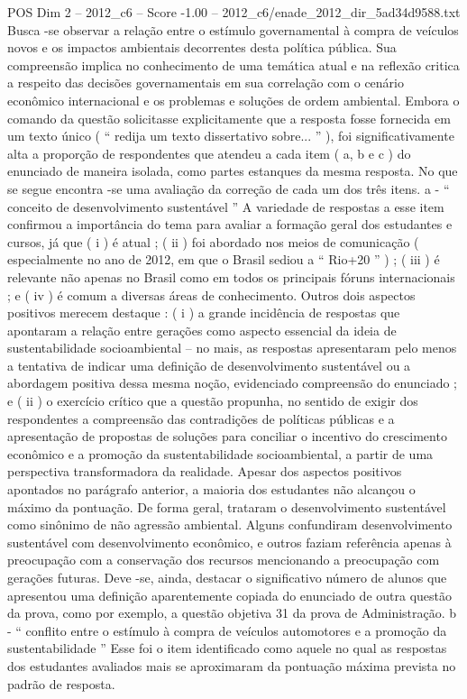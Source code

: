 \begin{textsample}{POS Dim 2 – 2012\_c6 – Score -1.00 – 2012\_c6/enade\_2012\_dir\_5ad34d9588.txt}
Busca -se observar a relação entre o estímulo governamental à compra de veículos novos e os impactos ambientais decorrentes desta política pública.
Sua compreensão implica no conhecimento de uma temática atual e na reflexão critica a respeito das decisões governamentais em sua correlação com o cenário econômico internacional e os problemas e soluções de ordem ambiental.
Embora o comando da questão solicitasse explicitamente que a resposta fosse fornecida em um texto único ( “ redija um texto dissertativo sobre... ” ), foi significativamente alta a proporção de respondentes que atendeu a cada item ( a, b e c ) do enunciado de maneira isolada, como partes estanques da mesma resposta.
No que se segue encontra -se uma avaliação da correção de cada um dos três itens. a - “ conceito de desenvolvimento sustentável ” A variedade de respostas a esse item confirmou a importância do tema para avaliar a formação geral dos estudantes e cursos, já que ( i ) é atual ; ( ii ) foi abordado nos meios de comunicação ( especialmente no ano de 2012, em que o Brasil sediou a “ Rio+20 ” ) ; ( iii ) é relevante não apenas no Brasil como em todos os principais fóruns internacionais ; e ( iv ) é comum a diversas áreas de conhecimento.
Outros dois aspectos positivos merecem destaque : ( i ) a grande incidência de respostas que apontaram a relação entre gerações como aspecto essencial da ideia de sustentabilidade socioambiental – no mais, as respostas apresentaram pelo menos a tentativa de indicar uma definição de desenvolvimento sustentável ou a abordagem positiva dessa mesma noção, evidenciado compreensão do enunciado ; e ( ii ) o exercício crítico que a questão propunha, no sentido de exigir dos respondentes a compreensão das contradições de políticas públicas e a apresentação de propostas de soluções para conciliar o incentivo do crescimento econômico e a promoção da sustentabilidade socioambiental, a partir de uma perspectiva transformadora da realidade.
Apesar dos aspectos positivos apontados no parágrafo anterior, a maioria dos estudantes não alcançou o máximo da pontuação.
De forma geral, trataram o desenvolvimento sustentável como sinônimo de não agressão ambiental.
Alguns confundiram desenvolvimento sustentável com desenvolvimento econômico, e outros faziam referência apenas à preocupação com a conservação dos recursos mencionando a preocupação com gerações futuras.
Deve -se, ainda, destacar o significativo número de alunos que apresentou uma definição aparentemente copiada do enunciado de outra questão da prova, como por exemplo, a questão objetiva 31 da prova de Administração. b - “ conflito entre o estímulo à compra de veículos automotores e a promoção da sustentabilidade ” Esse foi o item identificado como aquele no qual as respostas dos estudantes avaliados mais se aproximaram da pontuação máxima prevista no padrão de resposta.

\end{textsample}
